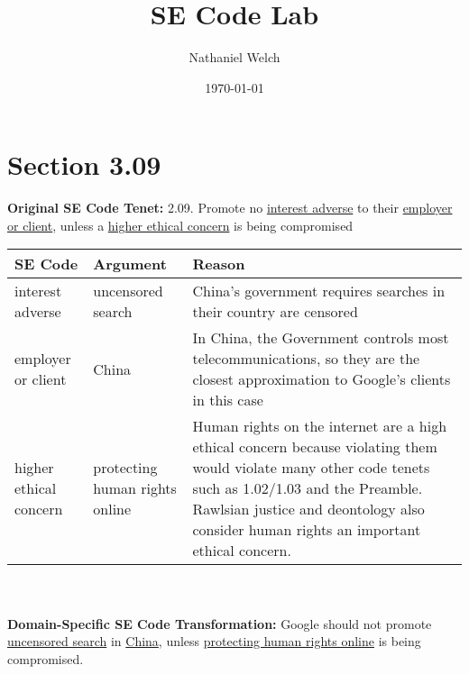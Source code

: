 \documentclass[]{article}
\title{SE Code Lab}
\author{Nathaniel Welch}
\date{\today}
\begin{document}
\ifpdf
{}
\else
{}
\fi

\maketitle

\section{Section 3.09}

\textbf{Original SE Code Tenet:}
2.09. Promote no \underline{interest adverse} to their \underline{employer or client}, unless a \underline{higher ethical concern} is
being compromised
\newline

\begin{tabular}{|p{100pt}|p{100pt}|p{220pt}|}
\hline
SE Code & Argument & Reason\\
\hline
interest adverse & uncensored search & China's government requires searches in their country are censored\\
\hline
employer or client & China & In China, the Government controls most telecommunications, so they are the closest approximation to Google's clients in this case\\
\hline
higher ethical concern & protecting human rights online & Human rights on the internet are a high ethical concern because violating them would violate many other code tenets such as 1.02/1.03 and the Preamble. Rawlsian justice and deontology also consider human rights an important ethical concern.\\
\hline
\end{tabular}\\
\newline\\
\textbf{Domain-Specific SE Code Transformation:}
Google should not promote \underline{uncensored search} in \underline{China}, unless \underline{protecting human rights online} is
being compromised.
\end{document}
